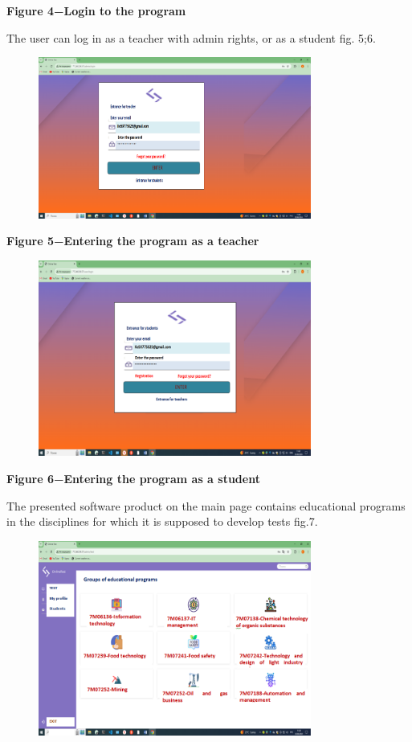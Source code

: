 {\bfseries Figure 4−Login to the program}

The user can log in as a teacher with admin rights, or as a student fig.
5;6.

\begin{figure}[H]
	\centering
	\includegraphics[width=0.8\textwidth]{assets/130}
	\caption*{}
\end{figure}

{\bfseries Figure 5−Entering the program as a teacher}

\begin{figure}[H]
	\centering
	\includegraphics[width=0.8\textwidth]{assets/131}
	\caption*{}
\end{figure}

{\bfseries Figure 6−Entering the program as a student}

The presented software product on the main page contains educational
programs in the disciplines for which it is supposed to develop tests
fig.7.

\begin{figure}[H]
	\centering
	\includegraphics[width=0.8\textwidth]{assets/132}
	\caption*{}
\end{figure}


